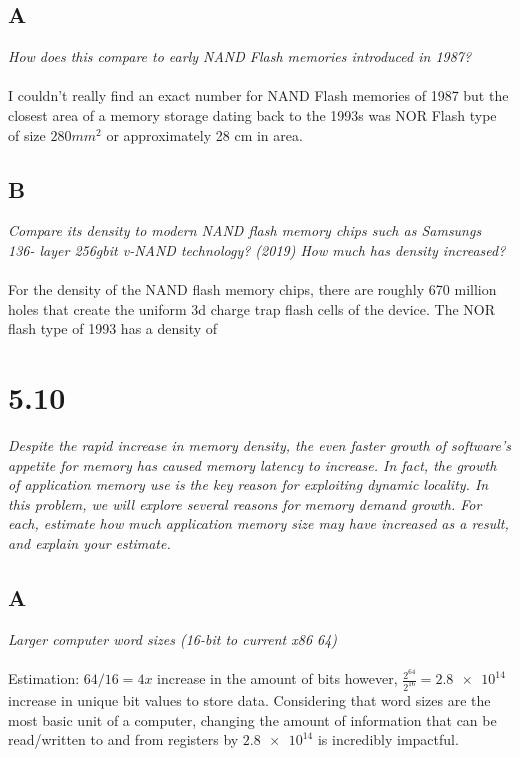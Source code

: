 \documentclass[10pt]{article}
\begin{document}
\subsection{A}
\textit{How does this compare to early NAND Flash memories introduced in 1987?}
\paragraph{}I couldn't really find an exact number for NAND Flash memories of 1987 but the closest area of a memory storage dating back to the 1993s was NOR Flash type of size $280mm^2$
or approximately 28 cm in area. 
\subsection{B}
\textit{Compare its density to modern NAND flash memory chips such as Samsungs 136-
layer 256gbit v-NAND technology? (2019) How much has density increased?}
\paragraph{} For the density of the NAND flash memory chips, there are roughly 670 million holes that create the uniform 3d charge trap flash cells of the device. The NOR flash type of 1993 has a density of 


\section{5.10}
\textit{Despite the rapid increase in memory density, the even faster growth of software’s
appetite for memory has caused memory latency to increase. In fact, the growth of application memory use is the key reason for exploiting dynamic locality. In this problem, we
will explore several reasons for memory demand growth. For each, estimate how much
application memory size may have increased as a result, and explain your estimate.}
\subsection{A}
\textit{Larger computer word sizes (16-bit to current x86 64)}
\paragraph{} Estimation: $64/16 = 4x$ increase in the amount of bits however, $\frac{2^{64}}{2^{16}} = \num{2.8e14}$ increase in unique bit values to store data.
 Considering that word sizes are the most basic unit of a computer, changing the amount of information that can be read/written to and from registers by $\num{2.8e14}$ is 
 incredibly impactful.  
\end{document}
